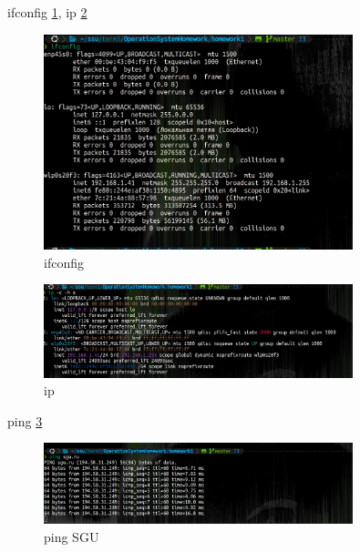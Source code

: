 ifconfig \ref{fig:ifconfig}, ip \ref{fig:ipconf}

\begin{figure}[!h]
    \centering
    \includegraphics[width = 0.8\textwidth]{images/ifconfig.png}
    
    \caption{ifconfig}
    
    \label{fig:ifconfig}
\end{figure}

\begin{figure}[!h]
    \centering
    \includegraphics[width = 0.8\textwidth]{images/ipconf.png}
    
    \caption{ip}
    
    \label{fig:ipconf}
\end{figure}

ping \ref{fig:pingSGU}

\begin{figure}[!h]
    \centering
    \includegraphics[width = 0.8\textwidth]{images/pingSGU.png}
    
    \caption{ping SGU}
    
    \label{fig:pingSGU}
\end{figure}

\newpage

